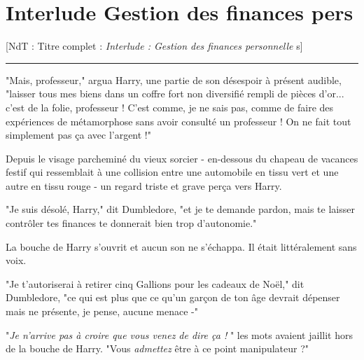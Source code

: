 
\chapter{Interlude   Gestion des finances pers}

[NdT : Titre complet :\emph{ Interlude : Gestion des finances personnelle} s]
\par\noindent\rule{\textwidth}{0.4pt}
"Mais, professeur," argua Harry, une partie de son désespoir à présent audible, "laisser tous mes biens dans un coffre fort non diversifié rempli de pièces d'or... c'est de la folie, professeur ! C'est comme, je ne sais pas, comme de faire des expériences de métamorphose sans avoir consulté un professeur ! On ne fait tout simplement pas ça avec l'argent !"

Depuis le visage parcheminé du vieux sorcier - en-dessous du chapeau de vacances festif qui ressemblait à une collision entre une automobile en tissu vert et une autre en tissu rouge - un regard triste et grave perça vers Harry.

"Je suis désolé, Harry," dit Dumbledore, "et je te demande pardon, mais te laisser contrôler tes finances te donnerait bien trop d'autonomie."

La bouche de Harry s'ouvrit et aucun son ne s'échappa. Il était littéralement sans voix.

"Je t'autoriserai à retirer cinq Gallions pour les cadeaux de Noël," dit Dumbledore, "ce qui est plus que ce qu'un garçon de ton âge devrait dépenser mais ne présente, je pense, aucune menace -"

"\emph{Je n'arrive pas à croire que vous venez de dire ça !} " les mots avaient jaillit hors de la bouche de Harry. "Vous \emph{admettez}  être à ce point manipulateur ?"

